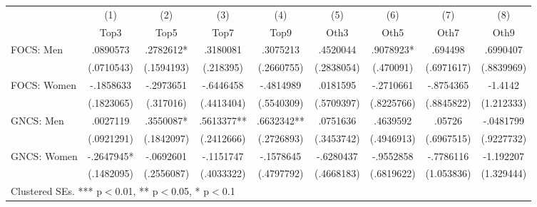 \begin{adjustbox}{max width=\textwidth}
\begin{tabular}{lcccccccc}
\toprule
 & (1) & (2) & (3) & (4) & (5) & (6) & (7) & (8) \\
 & Top3 & Top5 & Top7 & Top9 & Oth3 & Oth5 & Oth7 & Oth9 \\
\midrule
FOCS: Men & .0890573 & .2782612* & .3180081 & .3075213 & .4520044 & .9078923* & .694498 & .6990407 \\
 & (.0710543) & (.1594193) & (.218395) & (.2660755) & (.2838054) & (.470091) & (.6971617) & (.8839969) \\[0.3em]
FOCS: Women & -.1858633 & -.2973651 & -.6446458 & -.4814989 & .0181595 & -.2710661 & -.8754365 & -1.4142 \\
 & (.1823065) & (.317016) & (.4413404) & (.5540309) & (.5709397) & (.8225766) & (.8845822) & (1.212333) \\[0.3em]
GNCS: Men & .0027119 & .3550087* & .5613377** & .6632342** & .0751636 & .4639592 & .05726 & -.0481799 \\
 & (.0921291) & (.1842097) & (.2412666) & (.2726893) & (.3453742) & (.4946913) & (.6967515) & (.9227732) \\[0.3em]
GNCS: Women & -.2647945* & -.0692601 & -.1151747 & -.1578645 & -.6280437 & -.9552858 & -.7786116 & -1.192207 \\
 & (.1482095) & (.2556087) & (.4033322) & (.4797792) & (.4668183) & (.6819622) & (1.053836) & (1.329444) \\[0.3em]
\bottomrule
\multicolumn{9}{l}{\footnotesize Clustered SEs. *** p$<$0.01, ** p$<$0.05, * p$<$0.1} \\
\end{tabular}
\end{adjustbox}
